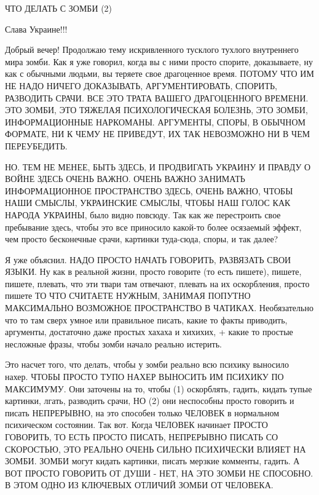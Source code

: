  
 
 
 
 


ЧТО ДЕЛАТЬ С ЗОМБИ (2)

Слава Украине!!! 💛 💙 💛 💙 💛 💙 💛

Добрый вечер! Продолжаю тему искривленного тусклого тухлого внутреннего мира
зомби. Как я уже говорил, когда вы с ними просто спорите, доказываете, ну как с
обычными людьми, вы теряете свое драгоценное время. ПОТОМУ ЧТО ИМ НЕ НАДО
НИЧЕГО ДОКАЗЫВАТЬ, АРГУМЕНТИРОВАТЬ, СПОРИТЬ, РАЗВОДИТЬ СРАЧИ.  ВСЕ ЭТО ТРАТА
ВАШЕГО ДРАГОЦЕННОГО ВРЕМЕНИ. ЭТО ЗОМБИ, ЭТО ТЯЖЕЛАЯ ПСИХОЛОГИЧЕСКАЯ БОЛЕЗНЬ,
ЭТО ЗОМБИ, ИНФОРМАЦИОННЫЕ НАРКОМАНЫ. АРГУМЕНТЫ, СПОРЫ, В ОБЫЧНОМ ФОРМАТЕ, НИ К
ЧЕМУ НЕ ПРИВЕДУТ, ИХ ТАК НЕВОЗМОЖНО НИ В ЧЕМ ПЕРЕУБЕДИТЬ.

НО. ТЕМ НЕ МЕНЕЕ, БЫТЬ ЗДЕСЬ, И ПРОДВИГАТЬ УКРАИНУ И ПРАВДУ О ВОЙНЕ ЗДЕСЬ ОЧЕНЬ
ВАЖНО. ОЧЕНЬ ВАЖНО ЗАНИМАТЬ ИНФОРМАЦИОННОЕ ПРОСТРАНСТВО ЗДЕСЬ, ОЧЕНЬ ВАЖНО,
ЧТОБЫ НАШИ СМЫСЛЫ, УКРАИНСКИЕ СМЫСЛЫ, ЧТОБЫ НАШ ГОЛОС КАК НАРОДА УКРАИНЫ, было
видно повсюду. Так как же перестроить свое пребывание здесь, чтобы это все
приносило какой-то более осязаемый эффект, чем просто бесконечные срачи,
картинки туда-сюда, споры, и так далее?

Я уже объяснил. НАДО ПРОСТО НАЧАТЬ ГОВОРИТЬ, РАЗВЯЗАТЬ СВОИ ЯЗЫКИ. Ну как в
реальной жизни, просто говорите (то есть пишете), пишете, пишете, плевать, что
эти твари там отвечают, плевать на их оскорбления, просто пишете ТО ЧТО
СЧИТАЕТЕ НУЖНЫМ, ЗАНИМАЯ ПОПУТНО МАКСИМАЛЬНО ВОЗМОЖНОЕ ПРОСТРАНСТВО В ЧАТИКАХ.
Необязательно что то там сверх умное или правильное писать, какие то факты
приводить, аргументы, достаточно даже простых хахаха и хихихих, + какие то
простые несложные фразы, чтобы зомби начало реально истерить.

Это насчет того, что делать, чтобы у зомби реально всю психику выносило нахер.
ЧТОБЫ ПРОСТО ТУПО НАХЕР ВЫНОСИТЬ ИМ ПСИХИКУ ПО МАКСИМУМУ. Они заточены на то,
чтобы (1) оскорблять, гадить, кидать тупые картинки, лгать, разводить срачи, НО
(2) они неспособны просто говорить и писать НЕПРЕРЫВНО, на это способен только
ЧЕЛОВЕК в нормальном психическом состоянии. Так вот. Когда ЧЕЛОВЕК начинает
ПРОСТО ГОВОРИТЬ, ТО ЕСТЬ ПРОСТО ПИСАТЬ, НЕПРЕРЫВНО ПИСАТЬ СО СКОРОСТЬЮ, ЭТО
РЕАЛЬНО ОЧЕНЬ СИЛЬНО ПСИХИЧЕСКИ ВЛИЯЕТ НА ЗОМБИ. ЗОМБИ могут кидать картинки,
писать мерзкие комменты, гадить. А ВОТ ПРОСТО ГОВОРИТЬ ОТ ДУШИ - НЕТ, НА ЭТО
ЗОМБИ НЕ СПОСОБНО.  В ЭТОМ ОДНО ИЗ КЛЮЧЕВЫХ ОТЛИЧИЙ ЗОМБИ ОТ ЧЕЛОВЕКА.

